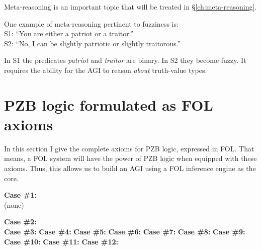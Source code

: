 Meta-reasoning is an important topic that will be treated in \S\ref{ch:meta-reasoning}.

One example of meta-reasoning pertinent to fuzziness is:\\
\hspace*{1cm} S1: ``You are either a patriot or a traitor.''\\
\hspace*{1cm} S2: ``No, I can be slightly patriotic or slightly traitorous.''

In S1 the predicates \textit{patriot} and \textit{traitor} are binary.  In S2 they become fuzzy.  It requires the ability for the AGI to reason \textit{about} truth-value types.

\section{PZB logic formulated as FOL axioms}

In this section I give the complete axioms for PZB logic, expressed in FOL.  That means, a FOL system will have the power of PZB logic when equipped with these axioms.  Thus, this allows us to build an AGI using a FOL inference engine as the core.

\textbf{Case \#1:}\\
(none)

\textbf{Case \#2:}\\


\textbf{Case \#3:}
\textbf{Case \#4:}
\textbf{Case \#5:}
\textbf{Case \#6:}
\textbf{Case \#7:}
\textbf{Case \#8:}
\textbf{Case \#9:}
\textbf{Case \#10:}
\textbf{Case \#11:}
\textbf{Case \#12:}




